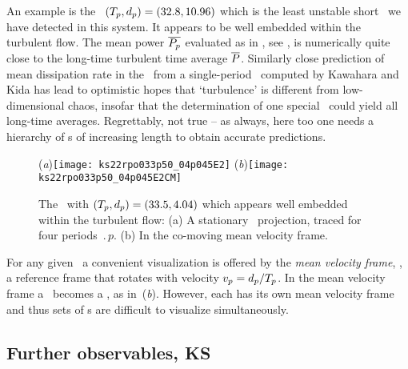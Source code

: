 An example is the \rpo\ $({T_{p}},d_p) = (32.8,10.96)$
which {is the least unstable short \rpo\ we have detected in this system.
It} appears to be well embedded within the turbulent flow. The mean power
$\overline{P_p}$ evaluated as in , see ,
is numerically quite close to the long-time turbulent time average
$\overline{P}$. Similarly close prediction of mean dissipation rate in
the \pCf\ from a single-period \po\ computed by Kawahara and
Kida has lead to optimistic hopes that `turbulence' is
different from low-dimensional chaos, insofar that the determination of
one special \po\ could yield all long-time averages. Regrettably, not
true -- as always, here too one needs a hierarchy of \po s of increasing
length to obtain accurate predictions.

\begin{figure}[t]
\begin{center}
(\textit{a})\texttt{[image: ks22rpo033p50\_04p045E2]}
(\textit{b})\texttt{[image: ks22rpo033p50\_04p045E2CM]}
\\
\end{center}
\caption{
 The
\rpo\ with $({T_{p}},d_p) =(33.5,4.04)$
which appears well embedded within the turbulent flow:
 (a) A stationary \statesp\ projection,
  traced for four periods $\period{p}$.
 (b) In the co-moving mean velocity frame.
        } \label{f:MeanVelocityFrame}
\end{figure}

For any given \rpo\ a convenient visualization is
offered by the {\em mean velocity frame}, {\ie},
a reference frame that rotates with velocity
$v_p=d_p/{T_{p}}$.
In the mean velocity frame a \rpo\ becomes
a \po, as in \,(\textit{b}).
However, each {\rpo} has its own mean velocity frame and thus
sets of \rpo s are difficult to visualize simultaneously.

\subsection{Further observables, KS}
\label{sec:moreObs}

